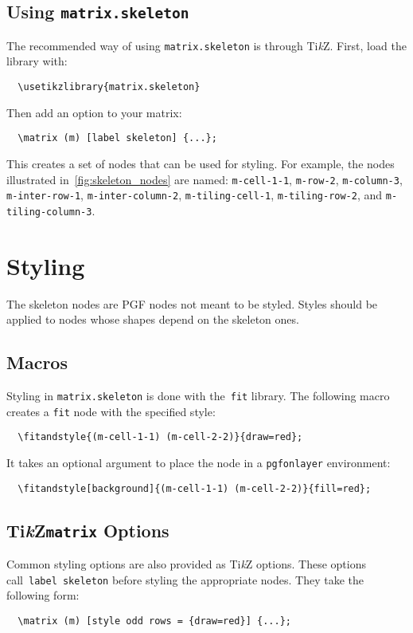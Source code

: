 \documentclass{scrartcl}
\newcommand\code\texttt
\newcommand{\TikZ}{Ti\textit{k}Z\xspace}
\begin{document}
\subsection{Using \code{matrix.skeleton}}

The recommended way of using \code{matrix.skeleton} is through \TikZ.
First, load the library with:
\begin{verbatim}
  \usetikzlibrary{matrix.skeleton}
\end{verbatim}
Then add an option to your matrix:
\begin{verbatim}
  \matrix (m) [label skeleton] {...};
\end{verbatim}
This creates a set of nodes that can be used for styling.
For example, the nodes illustrated in~\cref{fig:skeleton_nodes} are named: \code{m-cell-1-1}, \code{m-row-2}, \code{m-column-3}, \code{m-inter-row-1}, \code{m-inter-column-2}, \code{m-tiling-cell-1}, \code{m-tiling-row-2}, and \code{m-tiling-column-3}.

\section{Styling}
\label{sec:styling}

The skeleton nodes are PGF nodes not meant to be styled.
Styles should be applied to nodes whose shapes depend on the skeleton ones.

\subsection{Macros}

Styling in \code{matrix.skeleton} is done with the~\code{fit} library.
The following macro creates a \code{fit} node with the specified style:
\begin{verbatim}
  \fitandstyle{(m-cell-1-1) (m-cell-2-2)}{draw=red};
\end{verbatim}

It takes an optional argument to place the node in a \code{pgfonlayer} environment:
\begin{verbatim}
  \fitandstyle[background]{(m-cell-1-1) (m-cell-2-2)}{fill=red};
\end{verbatim}

\subsection{\TikZ \code{matrix} Options}

Common styling options are also provided as \TikZ options.
These options call~\code{label skeleton} before styling the appropriate nodes.
They take the following form:
\begin{verbatim}
  \matrix (m) [style odd rows = {draw=red}] {...};
\end{verbatim}
\end{document}
